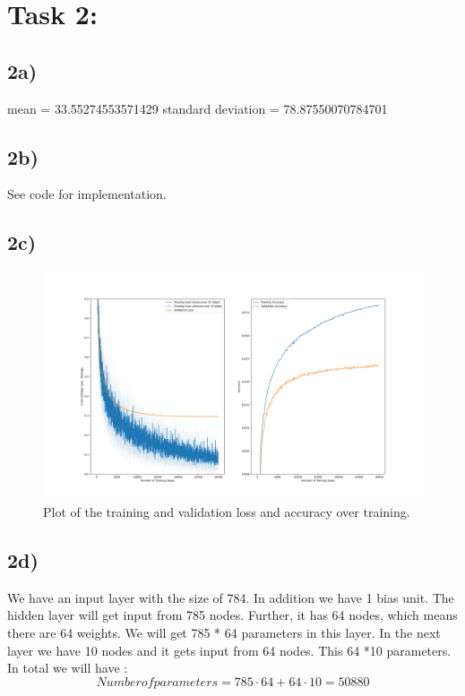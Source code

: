 \documentclass{article}
\begin{document}
\section*{Task 2:}

\subsection*{2a)}

mean = 33.55274553571429 \newline
standard deviation  = 78.87550070784701

\subsection*{2b)}
See code for implementation.
\subsection*{2c)}

\begin{figure}[h!]
    \centering
    \includegraphics[width=\linewidth]{task2c_train_loss.png}
    \caption[short]{Plot of the training and validation loss and accuracy over training.}
\end{figure}


\subsection*{2d)}

We have an input layer with the size of 784. In addition we have 1 bias unit. The hidden layer will
get input from 785 nodes. Further, it has 64 nodes, which means there are 64 weights. We will 
get 785 * 64 parameters in this layer. In the next layer we have 10 nodes and it gets input from 64 nodes. This 64 *10 parameters.
In total we will have : \newline
\begin{equation}
    Number of parameters = 785 \cdot 64 + 64 \cdot 10 = 50880 
\end{equation}
\end{document}
